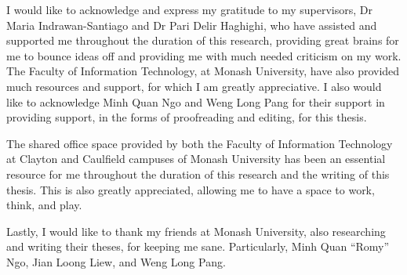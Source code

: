 
\begin{acknowledgements}


I would like to acknowledge and express my gratitude to my supervisors, Dr Maria Indrawan-Santiago and Dr Pari Delir
Haghighi, who have assisted and supported me throughout the duration of this research, providing great brains for me to
bounce ideas off and providing me with much needed criticism on my work. The Faculty of Information Technology,
at Monash University, have also provided much resources and support, for which I am greatly appreciative. I also would like
to acknowledge Minh Quan Ngo and Weng Long Pang for their support in providing support, in the forms of proofreading and editing, for this thesis.

The shared office space provided by both the Faculty of Information Technology at Clayton and Caulfield campuses of Monash
University has been an essential resource for me throughout the duration of this research and the writing of this thesis.
This is also greatly appreciated, allowing me to have a space to work, think, and play.

Lastly, I would like to thank my friends at Monash University, also researching and writing their theses, for keeping me
sane. Particularly, Minh Quan ``Romy'' Ngo, Jian Loong Liew, and Weng Long Pang.

\end{acknowledgements}
